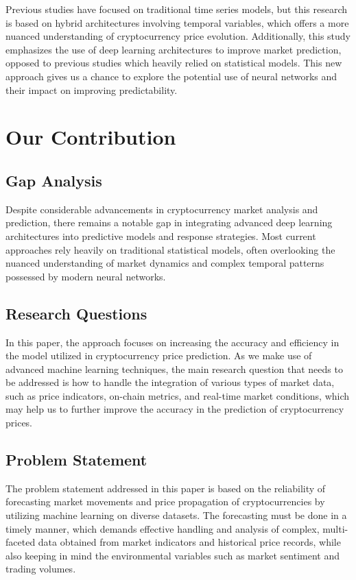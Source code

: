 \documentclass[conference]{IEEEtran}
\begin{document}
Previous studies have focused on traditional time series models, but this research is based on hybrid architectures involving temporal variables, which offers a more nuanced understanding of cryptocurrency price evolution. Additionally, this study emphasizes the use of deep learning architectures to improve market prediction, opposed to previous studies which heavily relied on statistical models. This new approach gives us a chance to explore the potential use of neural networks and their impact on improving predictability.

\section{Our Contribution}

\subsection{Gap Analysis}

Despite considerable advancements in cryptocurrency market analysis and prediction, there remains a notable gap in integrating advanced deep learning architectures into predictive models and response strategies. Most current approaches rely heavily on traditional statistical models, often overlooking the nuanced understanding of market dynamics and complex temporal patterns possessed by modern neural networks.

\subsection{Research Questions}

In this paper, the approach focuses on increasing the accuracy and efficiency in the model utilized in cryptocurrency price prediction. As we make use of advanced machine learning techniques, the main research question that needs to be addressed is how to handle the integration of various types of market data, such as price indicators, on-chain metrics, and real-time market conditions, which may help us to further improve the accuracy in the prediction of cryptocurrency prices.

\subsection{Problem Statement}

The problem statement addressed in this paper is based on the reliability of forecasting market movements and price propagation of cryptocurrencies by utilizing machine learning on diverse datasets. The forecasting must be done in a timely manner, which demands effective handling and analysis of complex, multi-faceted data obtained from market indicators and historical price records, while also keeping in mind the environmental variables such as market sentiment and trading volumes.
\end{document}
